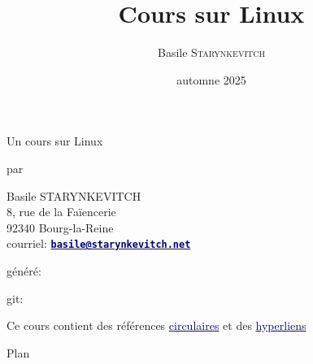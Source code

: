 \documentclass[lualatex,11pt,a4paper,svgnames,french]{beamer}
\title{Cours sur Linux}
\author{Basile \textsc{Starynkevitch}}
\date{automne 2025}
\newcommand{\clbemail}[1]{{\href{mailto:#1}{\texttt{\textbf{\textcolor{Navy}{#1}}}}}}
\begin{document}
\begin{frame}
\titlepage
\end{frame}

\begin{frame}{Un cours sur Linux}

  par

  \begin{center}Basile STARYNKEVITCH \\
  8, rue de la Faïencerie \\
  92340 Bourg-la-Reine \\
  courriel: \clbemail{basile@starynkevitch.net}
  \end{center}
  \bigskip
  
  généré: \textit{\clbdate} 

  \bigskip
  
  git: \texttt{\clbgitid}

  \begin{center}
    Ce cours contient des références
    \href{https://fr.wikipedia.org/wiki/Raisonnement_circulaire}{\textcolor{Navy}{circulaires}}
    et des
    \href{https://fr.wikipedia.org/wiki/Hyperlien}{\textcolor{Navy}{hyperliens}}
  \end{center}
\end{frame}

\begin{frame}{Plan}
  \tableofcontents
\end{frame}

\end{document}
